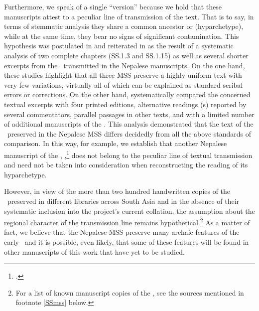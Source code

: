 Furthermore, we speak of a single “version” because we hold that these manuscripts
attest to a peculiar line of transmission of the text.  That is to say, in terms of
stemmatic analysis they share %
a common ancestor or (hyparchetype), while at the same time, they
bear no signs of significant contamination.  This hypothesis was postulated in
\citet{kleb-2010} and reiterated in \citet{kleb-2021a} as the result of a
systematic analysis of two complete chapters (SS.1.3 and SS.1.15) %
as well as several shorter excerpts from the \SS\ transmitted in the Nepalese
manuscripts. On the one hand, these studies highlight that all three MSS preserve
a highly uniform text with very few variations, virtually all of which can be
explained as standard scribal errors or corrections. On the other hand,
\citet{kleb-2010,kleb-2021a} systematically compared %
the concerned textual excerpts with four printed editions, alternative readings
(s) reported by several commentators, %
parallel passages in other texts, and with a limited number of additional
manuscripts of the \SS. This analysis demonstrated that the text of the \SS\
preserved in the Nepalese MSS differs decidedly from all the above standards of
comparison. In this way, for example, we establish that another Nepalese
manuscript of the \SS, \MS{Kathmandu NAK 1-1146},\footcite{rima-2022} does not
belong to the peculiar line of textual transmission and need not be taken into
consideration when reconstructing the reading of its hyparchetype. 

However, in view of the more than two hundred handwritten copies of the \SS\
preserved in different libraries across South Asia and in the absence of their
systematic inclusion into the project's current collation, the assumption about
the regional character of the transmission line remains hypothetical.\footnote{For
    a list of known manuscript copies of the \SS, see the sources mentioned in
    footnote \ref{SSmss} below.} As a matter of fact, we believe that the Nepalese MSS
    preserve many archaic features of the early \SS\ and it is possible, even likely,
    that some of these features will be found in other manuscripts of this work that
    have yet to be studied.%

